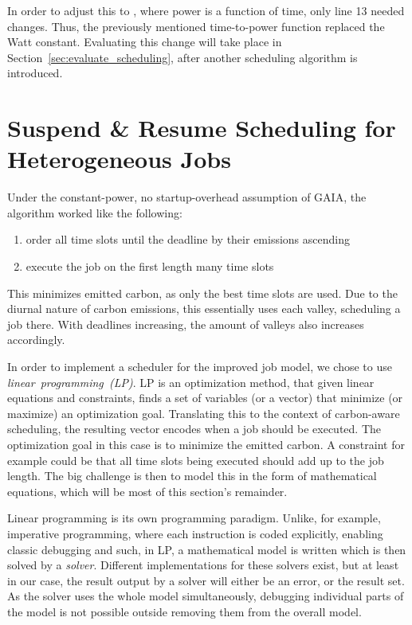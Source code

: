 In order to adjust this to \modelname, where power is a function of time, only line 13 needed changes. 
Thus, the previously mentioned time-to-power function replaced the Watt constant.
Evaluating this change will take place in Section~\ref{sec:evaluate_scheduling}, after another scheduling algorithm is introduced.

\section{{Suspend \& Resume Scheduling for Heterogeneous Jobs}} \label{sec:checkpoint_resume_lp}

Under the constant-power, no startup-overhead assumption of GAIA, the algorithm worked like the following:

\begin{enumerate}
    \item order all time slots until the deadline by their emissions ascending
    \item execute the job on the first length many time slots
\end{enumerate}

This minimizes emitted carbon, as only the best time slots are used.
Due to the diurnal nature of carbon emissions, this essentially uses each valley, scheduling a job there. 
With deadlines increasing, the amount of valleys also increases accordingly.

In order to implement a scheduler for the improved job model, we chose to use \emph{linear~programming~(LP)}.
LP is an optimization method, that given linear equations and constraints, finds a set of variables (or a vector) that minimize (or maximize) an optimization goal.
Translating this to the context of carbon-aware scheduling, the resulting vector encodes when a job should be executed.
The optimization goal in this case is to minimize the emitted carbon. 
A constraint for example could be that all time slots being executed should add up to the job length. 
The big challenge is then to model this in the form of mathematical equations, which will be most of this section's remainder.

Linear programming is its own programming paradigm. Unlike, for example, imperative programming, where each instruction is coded explicitly, enabling classic debugging and such, in LP, a mathematical model is written which is then solved by a \emph{solver}. 
Different implementations for these solvers exist, but at least in our case, the result output by a solver will either be an error, or the result set. 
As the solver uses the whole model simultaneously, debugging individual parts of the model is not possible outside removing them from the overall model.

